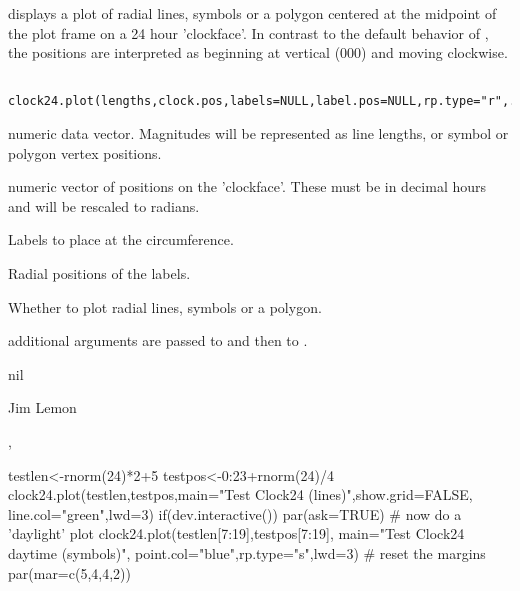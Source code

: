 \begin{Description}\relax
{} displays a plot of radial lines, symbols or a polygon
centered at the midpoint of the plot frame on a 24 hour 'clockface'. 
In contrast to the default behavior of , the positions 
are interpreted as beginning at vertical (000) and moving clockwise.
\end{Description}
\begin{Usage}
\begin{verbatim}
 clock24.plot(lengths,clock.pos,labels=NULL,label.pos=NULL,rp.type="r",...)
\end{verbatim}
\end{Usage}
\begin{Arguments}
\begin{ldescription}
\item[\code{lengths}] numeric data vector. Magnitudes will be represented as
line lengths, or symbol or polygon vertex positions.
\item[\code{clock.pos}] numeric vector of positions on the 'clockface'.
These must be in decimal hours and will be rescaled to radians.
\item[\code{labels}] Labels to place at the circumference.
\item[\code{label.pos}] Radial positions of the labels.
\item[\code{rp.type}] Whether to plot radial lines, symbols or a polygon.
\item[\code{...}] additional arguments are passed to  and
then to .
\end{ldescription}
\end{Arguments}
\begin{Value}
nil
\end{Value}
\begin{Author}\relax
Jim Lemon
\end{Author}
\begin{SeeAlso}\relax
{},
\end{SeeAlso}
\begin{Examples}
\begin{ExampleCode}
 testlen<-rnorm(24)*2+5
 testpos<-0:23+rnorm(24)/4
 clock24.plot(testlen,testpos,main="Test Clock24 (lines)",show.grid=FALSE,
  line.col="green",lwd=3)
 if(dev.interactive()) par(ask=TRUE)
 # now do a 'daylight' plot
 clock24.plot(testlen[7:19],testpos[7:19],
  main="Test Clock24 daytime (symbols)",
  point.col="blue",rp.type="s",lwd=3)
 # reset the margins
 par(mar=c(5,4,4,2))
\end{ExampleCode}
\end{Examples}

